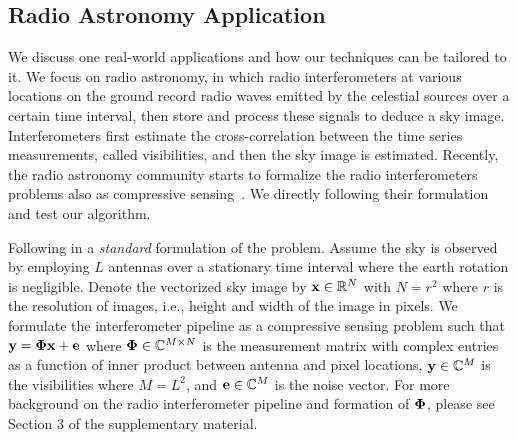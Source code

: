 \documentclass{article}
\begin{document}
\vspace{-0.5em}
\subsection{Radio Astronomy Application}
\vspace{-1em}

We discuss one real-world applications and how
our techniques can be tailored to it.
We focus on radio astronomy, in which radio interferometers at various locations on the ground record radio waves emitted by the celestial sources over a certain time interval, then store and process these signals to deduce a sky image. Interferometers first estimate the cross-correlation between the time series measurements, called visibilities, and then the sky image is estimated.
Recently, the radio astronomy community starts to formalize 
the radio interferometers problems also as
compressive sensing~\cite{wiaux2009csforra, wenger2010csforra, li2011deconvolution}.
We directly following their formulation and test
our algorithm.





Following in a {\em standard} formulation of the problem.
Assume the sky is observed by employing $L$ antennas over a stationary time interval where the earth rotation is negligible. Denote the vectorized sky image by ${\bf x} \in \mathbb{R}^N$ with $N = {r^2}$ where $r$ is the resolution of images, i.e., height and width of the image in pixels. We formulate the interferometer pipeline as a compressive sensing problem such that ${\bf y} = {\bf \Phi} {\bf x} + {\bf e}$ where ${\bf \Phi} \in \mathbb{C}^{M\times N}$ is the measurement matrix with complex entries as a function of inner product between antenna and pixel locations, ${\bf y} \in \mathbb{C}^{M}$ is the visibilities where $M=L^2$, and ${\bf e} \in \mathbb{C}^M$ is the noise vector. For more background on the radio interferometer pipeline and formation of ${\bf \Phi}$, please see Section 3 of the supplementary material.
\end{document}

